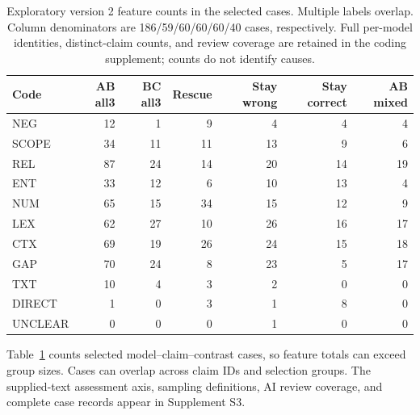 \documentclass[11pt,letterpaper]{article}
\begin{document}
\begin{table}[htbp]\centering\small
\caption{Exploratory version 2 feature counts in the selected cases. Multiple labels overlap. Column denominators are 186/59/60/60/60/40 cases, respectively. Full per-model identities, distinct-claim counts, and review coverage are retained in the coding supplement; counts do not identify causes.}\label{tab:features}
\begin{tabularx}{\linewidth}{Xrrrrrr}\toprule
Code & AB all3 & BC all3 & Rescue & Stay wrong & Stay correct & AB mixed \\\midrule
NEG & 12 & 1 & 9 & 4 & 4 & 4 \\
SCOPE & 34 & 11 & 11 & 13 & 9 & 6 \\
REL & 87 & 24 & 14 & 20 & 14 & 19 \\
ENT & 33 & 12 & 6 & 10 & 13 & 4 \\
NUM & 65 & 15 & 34 & 15 & 12 & 9 \\
LEX & 62 & 27 & 10 & 26 & 16 & 17 \\
CTX & 69 & 19 & 26 & 24 & 15 & 18 \\
GAP & 70 & 24 & 8 & 23 & 5 & 17 \\
TXT & 10 & 4 & 3 & 2 & 0 & 0 \\
DIRECT & 1 & 0 & 3 & 1 & 8 & 0 \\
UNCLEAR & 0 & 0 & 0 & 1 & 0 & 0 \\
\bottomrule
\end{tabularx}
\end{table}

Table~\ref{tab:features} counts selected model--claim--contrast cases, so feature totals can exceed group sizes. Cases can overlap across claim IDs and selection groups. The supplied-text assessment axis, sampling definitions, AI review coverage, and complete case records appear in Supplement S3.
\end{document}
